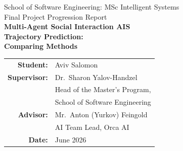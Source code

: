 \documentclass[12pt, a4paper]{article}
\begin{document}
  \begin{titlepage}
      \centering
      \vspace*{1cm}

      {\large School of Software Engineering: MSc Intelligent Systems}\\[0.5cm]
      {\large Final Project Progression Report}\\[1.5cm]

      {\Huge\bfseries Multi-Agent Social Interaction AIS\\[0.3cm]
      Trajectory Prediction:\\[0.3cm]
      Comparing Methods}\\[2cm]

      \begin{tabular}{rl}
          \textbf{Student:}    & Aviv Salomon \\[0.3cm]
          \textbf{Supervisor:} & Dr.\ Sharon Yalov-Handzel \\
                               & Head of the Master's Program, \\
                               & School of Software Engineering \\[0.3cm]
          \textbf{Advisor:}    & Mr.\ Anton (Yurkov) Feingold \\
                               & AI Team Lead, Orca AI \\[0.3cm]
          \textbf{Date:}       & June 2026 \\
      \end{tabular}

      \vfill
  \end{titlepage}

  \begin{abstract}
  This progression report documents the current state of the MSc thesis project
  \textit{Multi-Agent Social Interaction AIS Trajectory Prediction: Comparing Methods}.
  To date, the project has completed three major phases.
  First, a full AIS data preprocessing pipeline was built, converting Orca AI's
  proprietary 4-hour AIS archives into UniTraj-compatible training scenes at 1\,Hz
  with 5-minute past and future windows.
  Second, five prediction architectures were implemented and trained under a unified
  experimental protocol on the same dataset and split: a linear OLS baseline,
  TrAISformer, AIS-ACNet, Wayformer-AIS, and GAT-LSTM.
  Third, all models were evaluated on the held-out validation set; preliminary
  qualitative and horizon-decomposition analyses are presented in
  Section~\ref{sec:experiments}.
  Remaining work — encounter-type stratified evaluation, a full discussion, and
  the final conclusion — is outlined in Section~\ref{sec:remaining_work}.
  \end{abstract}
\end{document}
